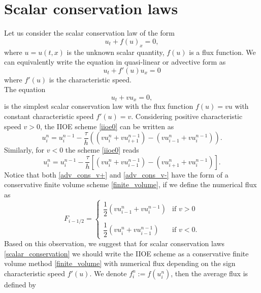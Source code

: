 \documentclass[../include.tex]{subfiles}
\begin{document}
\section{Scalar conservation laws}
Let us consider the scalar conservation law of the form
\begin{equation}
	u_t + f(u)_x = 0,
	\label{scalar_conservation}
\end{equation}
where $ u = u(t, x) $ is the unknown scalar quantity, $ f(u) $ is a flux function. We can equivalently write the equation in quasi-linear or advective form \cite{lev, whitham} as
\begin{equation}
	u_t + f'(u)u_x = 0
	\label{quasi-linear}
\end{equation}
where $ f'(u) $ is the characteristic speed.\\
The equation
\begin{equation}
	\label{advection_constant}
	u_t + vu_x = 0,
\end{equation}
is the simplest scalar conservation law with the flux function $ f(u) = vu $ with constant characteristic speed $ f'(u) = v $. Considering positive characteristic speed $ v > 0 $, the IIOE scheme \eqref{iioe0} can be written as
\begin{equation}
	\label{adv_cons_v+}
	u_i^{n} = u_i^{n - 1} - \frac{\tau}{h}\left((vu^n_{i} + vu^{n-1}_{i+1}) - (v u^n_{i-1} + v u^{n-1}_{i})\right).
\end{equation}
Similarly, for $ v < 0 $ the scheme \eqref{iioe0} reads
\begin{equation}
	\label{adv_cons_v-}
	u_i^{n} = u_i^{n - 1} - \frac{\tau}{h}\left[(vu^n_{i} + vu^{n-1}_{i-1}) - (v u^n_{i+1} + v u^{n-1}_{i})\right].
\end{equation}
Notice that both \eqref{adv_cons_v+} and \eqref{adv_cons_v-} have the form of a conservative finite volume scheme \eqref{finite_volume}, if we define the numerical flux as
\begin{equation}
	\label{iioe_lin_adv_flux}
	F_{i - 1/2} =
\begin{cases}
	\dfrac{1}{2}\left(vu^n_{i-1} + vu^{n-1}_{i}\right) &  \text{if } v > 0\\
	\\
	\dfrac{1}{2}\left(vu^n_{i} + vu^{n-1}_{i-1}\right) &  \text{if } v < 0.
\end{cases}
\end{equation}
Based on this observation, we suggest that for scalar conservation laws \eqref{scalar_conservation} we should write the IIOE scheme as a conservative finite volume method \eqref{finite_volume} with numerical flux depending on the sign characteristic speed $ f'(u) $. We denote $ f_i^n:= f(u_i^n) $, then the average flux is defined by
\end{document}

